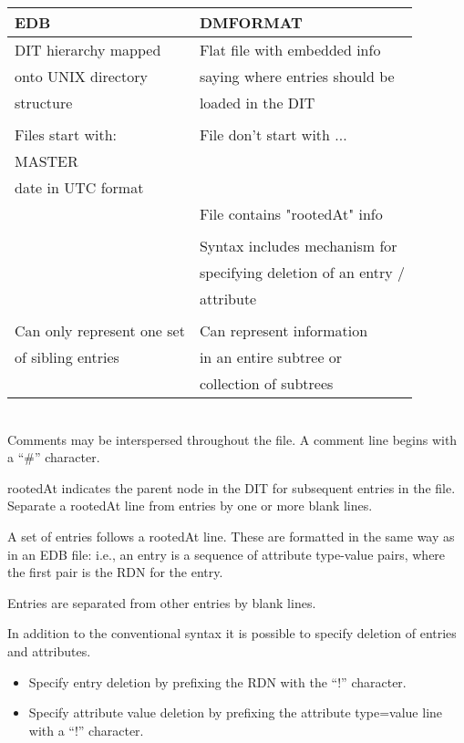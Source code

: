 \begin {tabular}{|l|l|}
\hline
EDB & DMFORMAT \\
\hline
\hline
DIT hierarchy mapped & Flat file with embedded info \\
onto UNIX directory & saying where entries should be  \\
structure & loaded in the DIT \\
& \\
Files start with: & File don't start with ... \\
MASTER & \\
date in UTC format & \\
&                                    File contains "rootedAt" info \\
& \\
&                                    Syntax includes mechanism for \\
&                                    specifying deletion of an entry / \\
&                                    attribute \\
& \\
Can only represent one set&          Can represent information \\
of sibling entries &                 in an entire subtree or \\
&                                    collection of subtrees \\
\hline
\end {tabular}\\

Comments may be interspersed throughout the file.  A comment line begins
with a ``\#'' character.

rootedAt indicates the parent node in the DIT for subsequent entries in the
file.  Separate a rootedAt line from entries by one or more blank lines.

A set of entries follows a rootedAt line.  These are formatted in the same
way as in an EDB file: i.e., an entry is a sequence of attribute type-value
pairs, where the first pair is the RDN for the entry.

Entries are separated from other entries by blank lines.

In addition to the conventional syntax it is possible to specify deletion of
entries and attributes.
\begin{itemize}
\item Specify entry deletion by prefixing the RDN with the ``!'' character.
\item Specify attribute value deletion by prefixing the attribute type=value
line with a ``!'' character.
\end{itemize}


